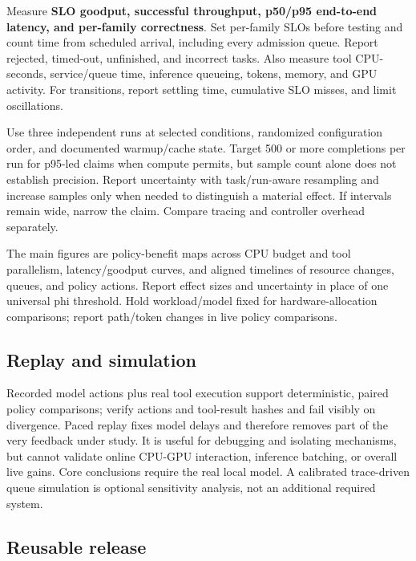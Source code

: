 \documentclass[10pt]{article}
\begin{document}
Measure \textbf{SLO goodput, successful throughput, p50/p95 end-to-end
latency, and per-family correctness}. Set per-family SLOs before testing
and count time from scheduled arrival, including every admission queue.
Report rejected, timed-out, unfinished, and incorrect tasks. Also
measure tool CPU-seconds, service/queue time, inference queueing,
tokens, memory, and GPU activity. For transitions, report settling time,
cumulative SLO misses, and limit oscillations.

Use three independent runs at selected conditions, randomized
configuration order, and documented warmup/cache state. Target 500 or
more completions per run for p95-led claims when compute permits, but
sample count alone does not establish precision. Report uncertainty with
task/run-aware resampling and increase samples only when needed to
distinguish a material effect. If intervals remain wide, narrow the
claim. Compare tracing and controller overhead separately.

The main figures are policy-benefit maps across CPU budget and tool
parallelism, latency/goodput curves, and aligned timelines of resource
changes, queues, and policy actions. Report effect sizes and uncertainty
in place of one universal phi threshold. Hold workload/model fixed for
hardware-allocation comparisons; report path/token changes in live
policy comparisons.

\hypertarget{replay-and-simulation}{%
\subsection{Replay and simulation}\label{replay-and-simulation}}

Recorded model actions plus real tool execution support deterministic,
paired policy comparisons; verify actions and tool-result hashes and
fail visibly on divergence. Paced replay fixes model delays and
therefore removes part of the very feedback under study. It is useful
for debugging and isolating mechanisms, but cannot validate online
CPU-GPU interaction, inference batching, or overall live gains. Core
conclusions require the real local model. A calibrated trace-driven
queue simulation is optional sensitivity analysis, not an additional
required system.

\hypertarget{reusable-release}{%
\subsection{Reusable release}\label{reusable-release}}
\end{document}
